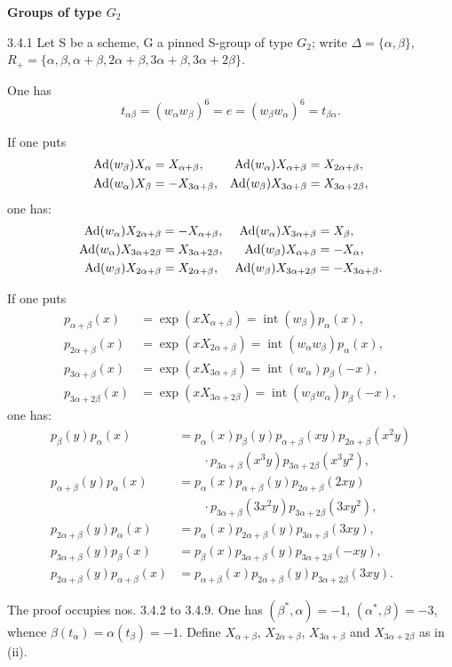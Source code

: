 \textbf{Groups of type $G_2$}
\begin{proposition}{3.4.1}\label{XXIII.3.4.1}
Let S be a scheme, G a pinned S-group of type $G_2$; write $\Delta=\{\alpha,\beta\}$, $R_+=\{\alpha,\beta,\alpha+\beta,2\alpha+\beta,3\alpha+\beta,3\alpha+2\beta\}$.
\begin{enumeratei}
\item One has
\[
t_{\alpha\beta}=(w_\alpha w_\beta)^6=e=(w_\beta w_\alpha)^6=t_{\beta\alpha}.
\]
\item If one puts
\[
\begin{aligned}
\operatorname{Ad}(w_\beta)X_\alpha&=X_{\alpha+\beta},&\operatorname{Ad}(w_\alpha)X_{\alpha+\beta}&=X_{2\alpha+\beta},\\
\operatorname{Ad}(w_\alpha)X_\beta&=-X_{3\alpha+\beta},&\operatorname{Ad}(w_\beta)X_{3\alpha+\beta}&=X_{3\alpha+2\beta},
\end{aligned}
\]
one has:
\[
\begin{aligned}
\operatorname{Ad}(w_\alpha)X_{2\alpha+\beta}&=-X_{\alpha+\beta},&\operatorname{Ad}(w_\alpha)X_{3\alpha+\beta}&=X_\beta,\\
\operatorname{Ad}(w_\alpha)X_{3\alpha+2\beta}&=X_{3\alpha+2\beta},&\operatorname{Ad}(w_\beta)X_{\alpha+\beta}&=-X_\alpha,\\
\operatorname{Ad}(w_\beta)X_{2\alpha+\beta}&=X_{2\alpha+\beta},&\operatorname{Ad}(w_\beta)X_{3\alpha+2\beta}&=-X_{3\alpha+\beta}.
\end{aligned}
\]
\item If one puts
\[
\begin{aligned}
p_{\alpha+\beta}(x)&=\exp(xX_{\alpha+\beta})=\operatorname{int}(w_\beta)p_\alpha(x),\\
p_{2\alpha+\beta}(x)&=\exp(xX_{2\alpha+\beta})=\operatorname{int}(w_\alpha w_\beta)p_\alpha(x),\\
p_{3\alpha+\beta}(x)&=\exp(xX_{3\alpha+\beta})=\operatorname{int}(w_\alpha)p_\beta(-x),\\
p_{3\alpha+2\beta}(x)&=\exp(xX_{3\alpha+2\beta})=\operatorname{int}(w_\beta w_\alpha)p_\beta(-x),
\end{aligned}
\]
one has:
\[
\begin{aligned}
p_\beta(y)p_\alpha(x)&=p_\alpha(x)p_\beta(y)p_{\alpha+\beta}(xy)p_{2\alpha+\beta}(x^2y)\\
&\qquad\cdot p_{3\alpha+\beta}(x^3y)p_{3\alpha+2\beta}(x^3y^2),\\
p_{\alpha+\beta}(y)p_\alpha(x)&=p_\alpha(x)p_{\alpha+\beta}(y)p_{2\alpha+\beta}(2xy)\\
&\qquad\cdot p_{3\alpha+\beta}(3x^2y)p_{3\alpha+2\beta}(3xy^2),\\
p_{2\alpha+\beta}(y)p_\alpha(x)&=p_\alpha(x)p_{2\alpha+\beta}(y)p_{3\alpha+\beta}(3xy),\\
p_{3\alpha+\beta}(y)p_\beta(x)&=p_\beta(x)p_{3\alpha+\beta}(y)p_{3\alpha+2\beta}(-xy),\\
p_{2\alpha+\beta}(y)p_{\alpha+\beta}(x)&=p_{\alpha+\beta}(x)p_{2\alpha+\beta}(y)p_{3\alpha+2\beta}(3xy).
\end{aligned}
\]
\end{enumeratei}
\end{proposition}
The proof occupies nos. 3.4.2 to 3.4.9. One has $(\beta^*,\alpha)=-1$, $(\alpha^*,\beta)=-3$, whence $\beta(t_\alpha)=\alpha(t_\beta)=-1$. Define $X_{\alpha+\beta}$, $X_{2\alpha+\beta}$, $X_{3\alpha+\beta}$ and $X_{3\alpha+2\beta}$ as in (ii).
